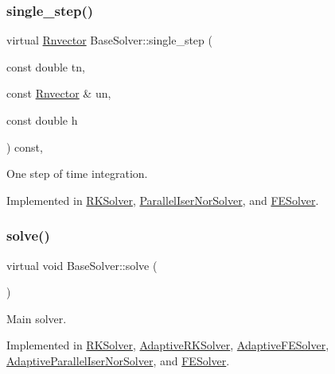 \mbox{\label{classBaseSolver_a66b4a8e6b6e0bb2f3564b2df849c79aa}} 
\subsubsection{\texorpdfstring{single\+\_\+step()}{single\_step()}}
{\footnotesize\ttfamily virtual \hyperlink{utils_8hpp_a8e0cccfe9e5cee5140bfcfbd9a3a6a0e}{Rnvector} Base\+Solver\+::single\+\_\+step (\begin{DoxyParamCaption}\item[{const double}]{tn,  }\item[{const \hyperlink{utils_8hpp_a8e0cccfe9e5cee5140bfcfbd9a3a6a0e}{Rnvector} \&}]{un,  }\item[{const double}]{h }\end{DoxyParamCaption}) const\hspace{0.3cm}{\ttfamily [protected]}, {}}



One step of time integration. 



Implemented in \hyperlink{classRKSolver_a12a097a860de0ed2647344661133ba90}{R\+K\+Solver}, \hyperlink{classParallelIserNorSolver_a10cac84b730cf473723461622f1a74e0}{Parallel\+Iser\+Nor\+Solver}, and \hyperlink{classFESolver_acb3624bbe9132b8ab2989fc97ac33d81}{F\+E\+Solver}.

\mbox{\label{classBaseSolver_a57f3b4ddec8693c61917aa37a2bac660}} 
\subsubsection{\texorpdfstring{solve()}{solve()}}
{\footnotesize\ttfamily virtual void Base\+Solver\+::solve (\begin{DoxyParamCaption}{ }\end{DoxyParamCaption})\hspace{0.3cm}{\ttfamily [pure virtual]}}



Main solver. 



Implemented in \hyperlink{classRKSolver_aa251eaaa56b4ef39d95347579b8a6259}{R\+K\+Solver}, \hyperlink{classAdaptiveRKSolver_ad4178bf295f9101b27ca96a92deb8c3e}{Adaptive\+R\+K\+Solver}, \hyperlink{classAdaptiveFESolver_a2d18dfe7c73872501d96df7fb1967f5f}{Adaptive\+F\+E\+Solver}, \hyperlink{classAdaptiveParallelIserNorSolver_a60b05ac78168b6e7dfc5b414d0fefdff}{Adaptive\+Parallel\+Iser\+Nor\+Solver}, and \hyperlink{classFESolver_ac6ac17db7001191c7bb32c3e8ce74d55}{F\+E\+Solver}.



